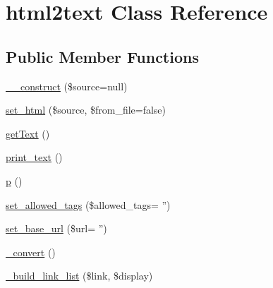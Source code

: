 \hypertarget{classhtml2text}{\section{html2text Class Reference}
\label{classhtml2text}
}
\subsection*{Public Member Functions}
\begin{DoxyCompactItemize}
\item 
\hyperlink{classhtml2text_ac404b5212f8b30c6b3b2e86806a5f5b2}{\-\_\-\-\_\-construct} (\$source=null)
\item 
\hyperlink{classhtml2text_abf3a1fc2ddd0622eaf181b68991cd382}{set\-\_\-html} (\$source, \$from\-\_\-file=false)
\item 
\hyperlink{classhtml2text_a160a9753434e61b3ff460860ca820c6d}{get\-Text} ()
\item 
\hyperlink{classhtml2text_aa1a63a82736ee37ea305e2e17b1b2cc9}{print\-\_\-text} ()
\item 
\hyperlink{classhtml2text_a65c9d6847400bced67eb0f82deb1784c}{p} ()
\item 
\hyperlink{classhtml2text_a426f32b8fc504be6eb0e2af96d9e11f6}{set\-\_\-allowed\-\_\-tags} (\$allowed\-\_\-tags= '')
\item 
\hyperlink{classhtml2text_afc4959f0839eccd625718914f879eabc}{set\-\_\-base\-\_\-url} (\$url= '')
\item 
\hyperlink{classhtml2text_adfcac63cc53ce5fd4f3ff2d72cf9a5c9}{\-\_\-convert} ()
\item 
\hyperlink{classhtml2text_a82ac6258106b2d8ad380dce11d9dddef}{\-\_\-build\-\_\-link\-\_\-list} (\$link, \$display)
\end{DoxyCompactItemize}
